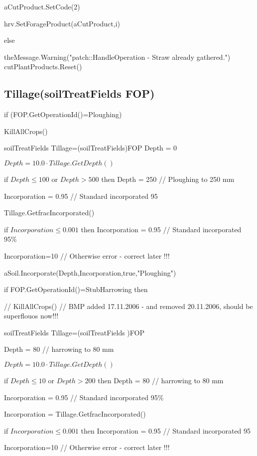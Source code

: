 \documentclass[%
]{scrartcl}
\begin{document}
{{{     aCutProduct.SetCode(2)
      
      hrv.SetForageProduct(aCutProduct,i)
     
   else
     
 theMessage.Warning("patch::HandleOperation - Straw already gathered.")
   cutPlantProducts.Reset()


\subsection{Tillage(soilTreatFields   FOP)}

	if (FOP.GetOperationId()=Ploughing)

   	
KillAllCrops()
	
	soilTreatFields   Tillage=(soilTreatFields)FOP
        Depth = 0
   
   $Depth=10.0 \cdot Tillage.GetDepth()$
     
 if $Depth\le 100$ or $ Depth>500$ then        
 Depth = 250 // Ploughing to 250 mm
   	
  Incorporation = 0.95 // Standard incorporated 95%
      
Tillage.GetfracIncorporated()
     
 if $Incorporation\le 0.001$ then      
     Incorporation = 0.95        
  // Standard incorporated 95\%
      
Incorporation=10 // Otherwise error - correct later !!!
	
  \quad	  aSoil.Incorporate(Depth,Incorporation,true,"Ploughing")
   
   if FOP.GetOperationId()=StubHarrowing then
   
   	// KillAllCrops()  // BMP added 17.11.2006 - and removed 20.11.2006, should be superflouos now!!!
   	
soilTreatFields   Tillage=(soilTreatFields )FOP
       
 Depth = 80    // harrowing to 80 mm
     
 $Depth = 10.0 \cdot Tillage.GetDepth()$
    
  if $Depth\le 10$ or $Depth>200$ then
         Depth = 80  // harrowing to 80 mm
         
   Incorporation = 0.95  // Standard incorporated 95\%
    
    Incorporation = Tillage.GetfracIncorporated()
   
   if $Incorporation\le 0.001$ then
       Incorporation = 0.95        // Standard incorporated 95%
  
   Incorporation=10  // Otherwise error - correct later !!!
     
}}}
\end{document}
